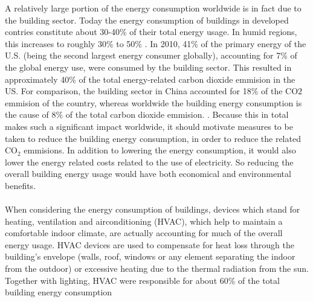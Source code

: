 A relatively large portion of the energy consumption worldwide is in fact due to
the building sector. 
Today the energy consumption of buildings in developed contries constitute about 30-40\%
of their total energy usage. In humid regions, this increases to roughly 30\% to 50\% 
\cite{AlRabghi2001, Wilde2004, Kwak2010}. 
In 2010, 41\% of the primary energy
of the U.S. (being the second largest energy consumer globally), accounting for 7\% of the global energy use,
were consumed by the building sector.
This resulted in approximately 40\% of the total energy-related carbon dioxide emmision in the US. 
For comparison, the building sector in China accounted for 18\% of the CO$2$ emmision of the country, 
whereas worldwide the building energy consumption is the cause of 8\% of the total carbon dioxide emmision.
\cite{buildingsEnergyDatabook, Hong2009}.
Because this in total makes such a significant impact worldwide, it should motivate 
measures to be taken to reduce the building energy consumption, in order to reduce the 
related CO$_2$ emmisions. In addition to lowering the energy consumption, it would also lower the 
energy related costs related to the use of electricity. So reducing the 
overall building energy usage would have both economical and environmental benefits. 
\\
\\
When considering the energy consumption of buildings, devices which stand for
heating, ventilation and airconditioning (HVAC), which help to maintain a comfortable indoor climate,
are actually accounting for much of the overall energy usage. 
HVAC devices are used to compensate for heat loss through the building's envelope 
(walls, roof, windows or any element separating the indoor from the outdoor) 
or excessive heating due to the thermal radiation from the sun.
Together with lighting, HVAC were responsible for about 60\% of the total building energy consumption 

